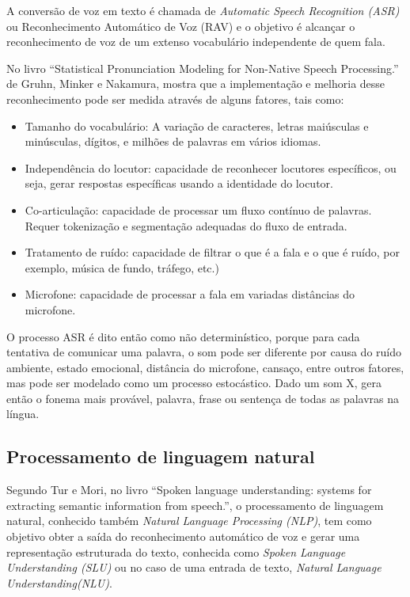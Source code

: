 \documentclass[
	12pt,				%
	oneside,
	a4paper,			%
	english,			%
	french,				%
	spanish,			%
	brazil				%
	]{abntex2}
\begin{document}
A conversão de voz em texto é chamada de \emph{Automatic Speech Recognition (ASR)} ou Reconhecimento Automático de Voz (RAV) e o objetivo é alcançar o reconhecimento de voz de um extenso vocabulário independente de quem fala.

No livro “Statistical Pronunciation Modeling for Non-Native Speech Processing.” de Gruhn, Minker e Nakamura, mostra que a implementação e melhoria desse reconhecimento pode ser medida através de alguns fatores, tais como:

\begin{itemize}
	\item Tamanho do vocabulário: A variação de caracteres, letras maiúsculas e minúsculas, dígitos, e milhões de palavras em vários idiomas.
	\item Independência do locutor: capacidade de reconhecer locutores específicos, ou seja, gerar respostas específicas usando a identidade do locutor.
	\item Co-articulação: capacidade de processar um fluxo contínuo de palavras. Requer tokenização e segmentação adequadas do fluxo de entrada.
	\item Tratamento de ruído: capacidade de filtrar o que é a fala e o que é ruído, por exemplo, música de fundo, tráfego, etc.)
	\item Microfone: capacidade de processar a fala em variadas distâncias do microfone.
\end{itemize}

O processo ASR é dito então como não determinístico, porque para cada tentativa de comunicar uma palavra, o som pode ser diferente por causa do ruído ambiente, estado emocional, distância do microfone, cansaço, entre outros fatores, mas pode ser modelado como um processo estocástico. Dado um som X, gera então o fonema mais provável, palavra, frase ou sentença de todas as palavras na língua.

\subsection{Processamento de linguagem natural}
Segundo Tur e Mori, no livro “Spoken language understanding: systems for extracting semantic information from speech.”, o processamento de linguagem natural, conhecido também \emph{Natural Language Processing (NLP)}, tem como objetivo obter a saída do reconhecimento automático de voz e gerar uma representação estruturada do texto, conhecida como \emph{Spoken Language Understanding (SLU)} ou no caso de uma entrada de texto, \emph{Natural Language Understanding(NLU)}.
\end{document}
